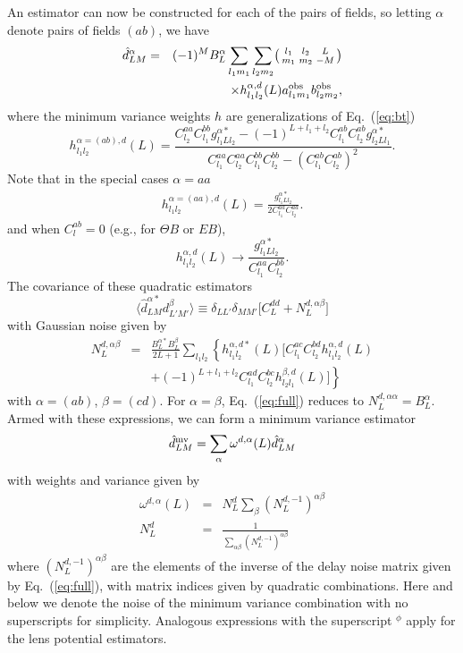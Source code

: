 \documentclass[prd,amsmath,amssymb,floatfix,superscriptaddress,nofootinbib,twocolumn]{revtex4-1}
\def\be{\begin{equation}}
\def\ee{\end{equation}}
\def\bea{\begin{eqnarray}}
\def\eea{\end{eqnarray}}
\newcommand{\ec}[1]{Eq.~(\ref{eq:#1})}
\newcommand{\eql}[1]{\label{eq:#1}}
\begin{document}
An estimator can now be constructed for each of the pairs of fields, so letting $\alpha$ denote pairs of fields $(ab)$, we have
\bea
\hat{d}^{\alpha}_{LM} &=&\nonumber  (-1)^{M} B_{L}^{\alpha}\sum_{l_{1}m_{1}}\sum_{l_{2}m_{2}}\bigl(\begin{smallmatrix} l_1 & l_2 & L \\ m_1 & m_2 & -M  \end{smallmatrix}\bigr) \\
&& \times h^{\alpha,d}_{l_{1}l_{2}}(L) a^{\rm obs}_{l_{1}m_{1}}b^{\rm obs}_{l_{2}m_{2}} ,
\eea
where the minimum variance weights $h$ are generalizations of \ec{bt} 
\be
h^{\alpha=(ab),d}_{l_{1}l_{2}}(L) 
= \frac{C_{l_{2}}^{aa}C_{l_{1}}^{bb}g^{\alpha*}_{l_{1}Ll_{2}}-(-1)^{L+l_{1}+l_{2}}C_{l_{1}}^{ab}C_{l_{2}}^{ab}g^{\alpha*}_{l_{2}Ll_{1}}}{C_{l_{1}}^{aa}C_{l_{2}}^{aa}C_{l_{1}}^{bb}C_{l_{2}}^{bb}-(C_{l_{1}}^{ab}C_{l_{2}}^{ab})^{2}}.
\ee
Note that in the special cases $\alpha=aa$
\bea 
h_{l_{1}l_{2}}^{\alpha=(aa),d}(L)= \frac{g_{l_{1}Ll_{2}}^{\alpha*}}{2C_{l_{1}}^{aa}C_{l_{2}}^{aa}}. 
\eea 
and when $C_{l}^{ab}=0$ (e.g., for $\Theta B$ or $EB$),
\be
h^{\alpha,d}_{l_{1}l_{2}}(L) \rightarrow \frac{g^{\alpha *}_{l_{1}Ll_{2}}}{C_{l_{1}}^{aa}C_{l_{2}}^{bb}}. 
\ee
The covariance of these quadratic estimators
\be
\langle \hat{d}^{\alpha*}_{LM}d^{\beta}_{L'M'}\rangle \equiv \delta_{LL'}\delta_{MM'}\big[ C_{L}^{dd}+N_{L}^{d,\alpha \beta} \big]
\ee
with Gaussian noise given by
\bea
N_{L}^{d,\alpha\beta}&=&\frac{B_{L}^{\alpha*}B_{L}^{\beta}}{2L+1}\sum_{l_{1}l_{2}}  \left\{ h_{l_{1}l_{2}}^{\alpha,d*} (L)\big[ C_{l_{1}}^{ac}C_{l_{2}}^{bd}h_{l_{1}l_{2}}^{\alpha,d}(L)\right. \nonumber \\
&&\left. +(-1)^{L+l_{1}+l_{2}}C_{l_{1}}^{ad}C_{l_{2}}^{bc} h_{l_{2}l_{1}}^{\beta,d}(L)  \big]\right\} \eql{full} 
\eea
with $\alpha=(ab)$, $\beta=(cd)$. For $\alpha=\beta$, \ec{full} reduces to $N_{L}^{d,\alpha\alpha}=B_{L}^{\alpha}$.
Armed with these expressions, we can form a minimum variance estimator
\be
\hat{d}^{\rm mv}_{LM} = \sum_{\alpha}\omega^{d,\alpha}(L)\hat{d}^{\alpha}_{LM}  
\eql{dmvw}
\ee
with weights and variance given by
\bea
\omega^{d,\alpha}(L) & =&N^{d}_{L} \sum_{\beta}(N_{L}^{d,-1})^{\alpha \beta} \eql{weight} \nonumber\\
N^{d}_{L} &=& \frac{1}{\sum_{\alpha\beta} (N_{L}^{d,-1})^{\alpha \beta}}
\eea
where $(N_{L}^{d,-1})^{\alpha\beta}$ are the elements of the inverse of the delay noise matrix given by \ec{full}, with matrix indices given by quadratic combinations.  Here and below
we denote the noise of the minimum variance combination with no superscripts for simplicity.  Analogous expressions with the superscript $^\phi$ apply for the lens potential estimators.
\end{document}
